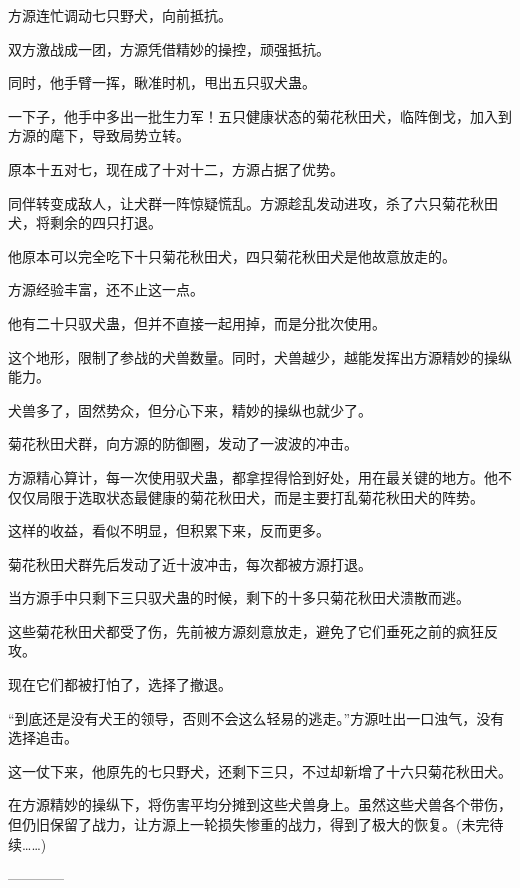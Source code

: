 \begin{this_body}
方源连忙调动七只野犬，向前抵抗。

双方激战成一团，方源凭借精妙的操控，顽强抵抗。

同时，他手臂一挥，瞅准时机，甩出五只驭犬蛊。

一下子，他手中多出一批生力军！五只健康状态的菊花秋田犬，临阵倒戈，加入到方源的麾下，导致局势立转。

原本十五对七，现在成了十对十二，方源占据了优势。

同伴转变成敌人，让犬群一阵惊疑慌乱。方源趁乱发动进攻，杀了六只菊花秋田犬，将剩余的四只打退。

他原本可以完全吃下十只菊花秋田犬，四只菊花秋田犬是他故意放走的。

方源经验丰富，还不止这一点。

他有二十只驭犬蛊，但并不直接一起用掉，而是分批次使用。

这个地形，限制了参战的犬兽数量。同时，犬兽越少，越能发挥出方源精妙的操纵能力。

犬兽多了，固然势众，但分心下来，精妙的操纵也就少了。

菊花秋田犬群，向方源的防御圈，发动了一波波的冲击。

方源精心算计，每一次使用驭犬蛊，都拿捏得恰到好处，用在最关键的地方。他不仅仅局限于选取状态最健康的菊花秋田犬，而是主要打乱菊花秋田犬的阵势。

这样的收益，看似不明显，但积累下来，反而更多。

菊花秋田犬群先后发动了近十波冲击，每次都被方源打退。

当方源手中只剩下三只驭犬蛊的时候，剩下的十多只菊花秋田犬溃散而逃。

这些菊花秋田犬都受了伤，先前被方源刻意放走，避免了它们垂死之前的疯狂反攻。

现在它们都被打怕了，选择了撤退。

“到底还是没有犬王的领导，否则不会这么轻易的逃走。”方源吐出一口浊气，没有选择追击。

这一仗下来，他原先的七只野犬，还剩下三只，不过却新增了十六只菊花秋田犬。

在方源精妙的操纵下，将伤害平均分摊到这些犬兽身上。虽然这些犬兽各个带伤，但仍旧保留了战力，让方源上一轮损失惨重的战力，得到了极大的恢复。(未完待续……)

------------

\end{this_body}

